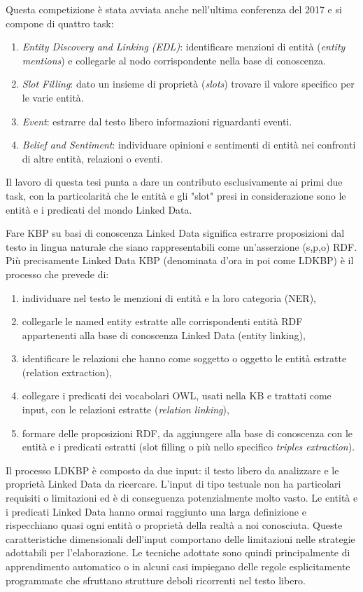 Questa competizione è stata avviata anche nell'ultima conferenza del 2017 e si compone di quattro task:
\begin{enumerate}
\item \textit{Entity Discovery and Linking (EDL)}: identificare menzioni di entità (\textit{entity mentions}) e collegarle al nodo corrispondente nella base di conoscenza.
\item \textit{Slot Filling}: dato un insieme di proprietà (\textit{slots}) trovare il valore specifico per le varie entità. 
\item \textit{Event}: estrarre dal testo libero informazioni riguardanti eventi.
\item \textit{Belief and Sentiment}: individuare opinioni e sentimenti di entità nei confronti di altre entità, relazioni o eventi.
\end{enumerate}

Il lavoro di questa tesi punta a dare un contributo esclusivamente ai primi due task, con la particolarità che le entità e gli "slot" presi in considerazione sono le entità e i predicati del mondo Linked Data.

Fare KBP su basi di conoscenza Linked Data significa estrarre proposizioni dal testo in lingua naturale che siano rappresentabili come un'asserzione (s,p,o) RDF.
Più precisamente Linked Data KBP (denominata d'ora in poi come LDKBP) è il processo che prevede di:
\begin{enumerate}
\item individuare nel testo le menzioni di entità e la loro categoria (NER),
\item collegarle le named entity estratte alle corrispondenti entità RDF appartenenti alla base di conoscenza Linked Data (entity linking), 
\item identificare le relazioni che hanno come soggetto o oggetto le entità estratte (relation extraction),
\item collegare i predicati dei vocabolari OWL, usati nella KB e trattati come input, con le relazioni estratte (\textit{relation linking}), 
\item formare delle proposizioni RDF, da aggiungere alla base di conoscenza con le entità e i predicati estratti (slot filling o più nello specifico \textit{triples extraction}).
\end{enumerate}

Il processo LDKBP è composto da due input: il testo libero da analizzare e le proprietà Linked Data da ricercare.
L'input di tipo testuale non ha particolari requisiti o limitazioni ed è di conseguenza potenzialmente molto vasto.
Le entità e i predicati Linked Data hanno ormai raggiunto una larga definizione e rispecchiano quasi ogni entità o proprietà della realtà a noi conosciuta. Queste caratteristiche dimensionali dell'input comportano delle limitazioni nelle strategie adottabili per l'elaborazione. Le tecniche adottate sono quindi principalmente di apprendimento automatico o in alcuni casi impiegano delle regole esplicitamente programmate che sfruttano strutture deboli ricorrenti nel testo libero.

